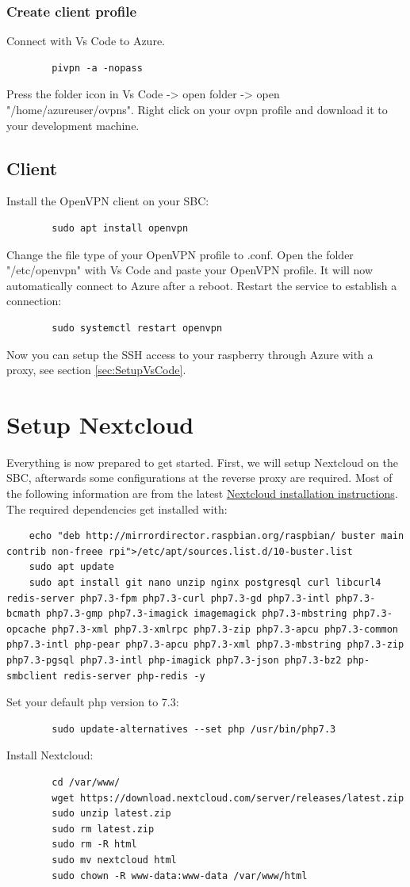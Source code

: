 \documentclass[a4paper,12pt]{article}
\begin{document}
	\subsubsection{Create client profile}
	Connect with Vs Code to Azure. 
	\begin{verbatim}
		pivpn -a -nopass
	\end{verbatim}
	Press the folder icon in Vs Code -> open folder -> open "/home/azureuser/ovpns".
	Right click on your ovpn profile and download it to your development machine.
	\subsection{Client}
	Install the OpenVPN client on your SBC:
	\begin{verbatim}
		sudo apt install openvpn
	\end{verbatim}
	Change the file type of your OpenVPN profile to .conf.
	Open the folder "/etc/openvpn" with Vs Code and paste your OpenVPN profile. It will now automatically connect to Azure after a reboot. Restart the service to establish a connection:
	\begin{verbatim}
		sudo systemctl restart openvpn
	\end{verbatim}
	Now you can setup the SSH access to your raspberry through Azure with a proxy, see section \ref{sec:SetupVsCode}.
	\section{Setup Nextcloud}
	Everything is now prepared to get started. First, we will setup Nextcloud on the SBC, afterwards some configurations at the reverse proxy are required.
	Most of the following information are from the latest \href{https://docs.nextcloud.com/server/latest/admin_manual/installation/source_installation.html}{Nextcloud installation instructions}.
	The required dependencies get installed with:
	\begin{verbatim}
	echo "deb http://mirrordirector.raspbian.org/raspbian/ buster main contrib non-freee rpi">/etc/apt/sources.list.d/10-buster.list
	sudo apt update
	sudo apt install git nano unzip nginx postgresql curl libcurl4 redis-server php7.3-fpm php7.3-curl php7.3-gd php7.3-intl php7.3-bcmath php7.3-gmp php7.3-imagick imagemagick php7.3-mbstring php7.3-opcache php7.3-xml php7.3-xmlrpc php7.3-zip php7.3-apcu php7.3-common php7.3-intl php-pear php7.3-apcu php7.3-xml php7.3-mbstring php7.3-zip  php7.3-pgsql php7.3-intl php-imagick php7.3-json php7.3-bz2 php-smbclient redis-server php-redis -y
	\end{verbatim}
	Set your default php version to 7.3:
	\begin{verbatim}
		sudo update-alternatives --set php /usr/bin/php7.3
	\end{verbatim}
	Install Nextcloud:
	\begin{verbatim}
		cd /var/www/
		wget https://download.nextcloud.com/server/releases/latest.zip
		sudo unzip latest.zip
		sudo rm latest.zip
		sudo rm -R html
		sudo mv nextcloud html
		sudo chown -R www-data:www-data /var/www/html
	\end{verbatim}
\end{document}
